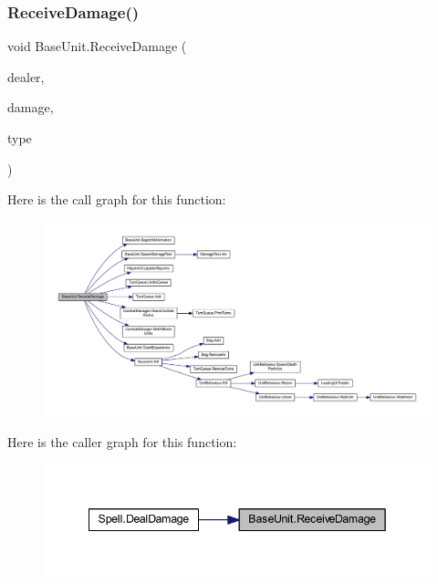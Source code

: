\subsubsection{\texorpdfstring{ReceiveDamage()}{ReceiveDamage()}}
{\footnotesize\ttfamily void Base\+Unit.\+Receive\+Damage (\begin{DoxyParamCaption}\item[{\mbox{\hyperlink{class_base_unit}{Base\+Unit}}}]{dealer,  }\item[{int}]{damage,  }\item[{\mbox{\hyperlink{class_spell_a3e228beaf92e2c035e6599aaf0ac2d2a}{Spell.\+Damage\+Type}}}]{type }\end{DoxyParamCaption})}

Here is the call graph for this function\+:
\nopagebreak
\begin{figure}[H]
\begin{center}
\leavevmode
\includegraphics[width=350pt]{class_base_unit_a8412f2b3e8ec9c3ff75b41b830fde443_cgraph}
\end{center}
\end{figure}
Here is the caller graph for this function\+:
\nopagebreak
\begin{figure}[H]
\begin{center}
\leavevmode
\includegraphics[width=342pt]{class_base_unit_a8412f2b3e8ec9c3ff75b41b830fde443_icgraph}
\end{center}
\end{figure}
\mbox{\label{class_base_unit_a0f900d0c70a2436dd81d8127f8d43336}} 
